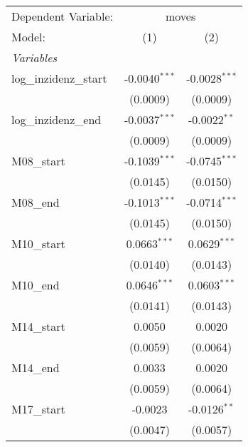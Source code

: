 \documentclass[10pt,a4paper]{article}
\author{Peer Lasse Hinrichsen}
\begin{document}
\begingroup
\centering
\begin{tabular}{lcc}
   \tabularnewline \midrule \midrule
   Dependent Variable: & \multicolumn{2}{c}{moves}\\
   Model:                                           & (1)             & (2)\\  
   \midrule
   \emph{Variables}\\
   log\_inzidenz\_start                             & -0.0040$^{***}$ & -0.0028$^{***}$\\   
                                                    & (0.0009)        & (0.0009)\\   
   log\_inzidenz\_end                               & -0.0037$^{***}$ & -0.0022$^{**}$\\   
                                                    & (0.0009)        & (0.0009)\\   
   M08\_start                                       & -0.1039$^{***}$ & -0.0745$^{***}$\\   
                                                    & (0.0145)        & (0.0150)\\   
   M08\_end                                         & -0.1013$^{***}$ & -0.0714$^{***}$\\   
                                                    & (0.0145)        & (0.0150)\\   
   M10\_start                                       & 0.0663$^{***}$  & 0.0629$^{***}$\\   
                                                    & (0.0140)        & (0.0143)\\   
   M10\_end                                         & 0.0646$^{***}$  & 0.0603$^{***}$\\   
                                                    & (0.0141)        & (0.0143)\\   
   M14\_start                                       & 0.0050          & 0.0020\\   
                                                    & (0.0059)        & (0.0064)\\   
   M14\_end                                         & 0.0033          & 0.0020\\   
                                                    & (0.0059)        & (0.0064)\\   
   M17\_start                                       & -0.0023         & -0.0126$^{**}$\\   
                                                    & (0.0047)        & (0.0057)\\   

\end{tabular}
\end{document}
